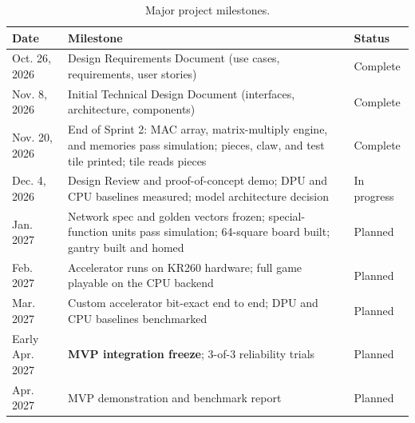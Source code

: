 \documentclass[10pt]{article}
\begin{document}
\begin{table}[H]
\centering\small
\caption{Major project milestones.}\label{tab:ms}
\begin{tabularx}{\textwidth}{@{}P{2.5cm} L P{1.7cm}@{}}
\toprule
\textbf{Date} & \textbf{Milestone} & \textbf{Status} \\
\midrule
Oct. 26, 2026 & Design Requirements Document (use cases, requirements, user stories) & Complete \\
Nov. 8, 2026 & Initial Technical Design Document (interfaces, architecture, components) & Complete \\
Nov. 20, 2026 & End of Sprint 2: MAC array, matrix-multiply engine, and memories pass simulation; pieces, claw, and test tile printed; tile reads pieces & Complete \\
Dec. 4, 2026 & Design Review and proof-of-concept demo; DPU and CPU baselines measured; model architecture decision & In progress \\
Jan. 2027 & Network spec and golden vectors frozen; special-function units pass simulation; 64-square board built; gantry built and homed & Planned \\
Feb. 2027 & Accelerator runs on KR260 hardware; full game playable on the CPU backend & Planned \\
Mar. 2027 & Custom accelerator bit-exact end to end; DPU and CPU baselines benchmarked & Planned \\
Early Apr. 2027 & \textbf{MVP integration freeze}; 3-of-3 reliability trials & Planned \\
Apr. 2027 & MVP demonstration and benchmark report & Planned \\
\bottomrule
\end{tabularx}
\end{table}
\end{document}
